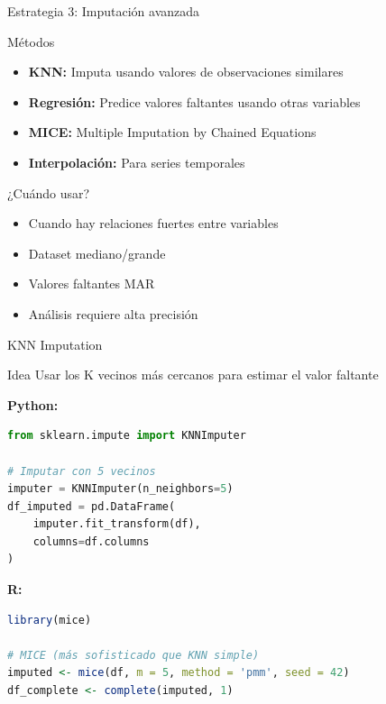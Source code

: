 \documentclass[aspectratio=169]{beamer}
\begin{document}
\begin{frame}{Estrategia 3: Imputación avanzada}
\begin{block}{Métodos}
\begin{itemize}
    \item \textbf{KNN:} Imputa usando valores de observaciones similares
    \item \textbf{Regresión:} Predice valores faltantes usando otras variables
    \item \textbf{MICE:} Multiple Imputation by Chained Equations
    \item \textbf{Interpolación:} Para series temporales
\end{itemize}
\end{block}

\pause

\begin{alertblock}{¿Cuándo usar?}
\begin{itemize}
    \item Cuando hay relaciones fuertes entre variables
    \item Dataset mediano/grande
    \item Valores faltantes MAR
    \item Análisis requiere alta precisión
\end{itemize}
\end{alertblock}
\end{frame}

\begin{frame}[fragile]{KNN Imputation}
\begin{block}{Idea}
Usar los K vecinos más cercanos para estimar el valor faltante
\end{block}

\textbf{Python:}
\begin{lstlisting}[language=Python]
from sklearn.impute import KNNImputer

# Imputar con 5 vecinos
imputer = KNNImputer(n_neighbors=5)
df_imputed = pd.DataFrame(
    imputer.fit_transform(df),
    columns=df.columns
)
\end{lstlisting}

\textbf{R:}
\begin{lstlisting}[language=R]
library(mice)

# MICE (más sofisticado que KNN simple)
imputed <- mice(df, m = 5, method = 'pmm', seed = 42)
df_complete <- complete(imputed, 1)
\end{lstlisting}
\end{frame}
\end{document}
